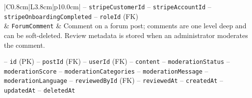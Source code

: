 \begin{center}
\begin{longtable}{|C{0.8cm}|L{3.8cm}|p{10.0cm}|}
\hspace*{1em}-- \texttt{stripe\allowbreak Customer\allowbreak Id} \newline
\hspace*{1em}-- \texttt{stripe\allowbreak Account\allowbreak Id} \newline
\hspace*{1em}-- \texttt{stripe\allowbreak Onboarding\allowbreak Completed} \newline
\hspace*{1em}-- \texttt{role\allowbreak Id} (FK) \\
 & \texttt{Forum\allowbreak Comment} & Comment on a forum post; comments are one level deep and can be soft-deleted. Review metadata is stored when an administrator moderates the comment.\par\smallskip
\hspace*{1em}-- \texttt{id} (PK) \newline
\hspace*{1em}-- \texttt{post\allowbreak Id} (FK) \newline
\hspace*{1em}-- \texttt{user\allowbreak Id} (FK) \newline
\hspace*{1em}-- \texttt{content} \newline
\hspace*{1em}-- \texttt{moderation\allowbreak Status} \newline
\hspace*{1em}-- \texttt{moderation\allowbreak Score} \newline
\hspace*{1em}-- \texttt{moderation\allowbreak Categories} \newline
\hspace*{1em}-- \texttt{moderation\allowbreak Message} \newline
\hspace*{1em}-- \texttt{moderation\allowbreak Language} \newline
\hspace*{1em}-- \texttt{reviewed\allowbreak By\allowbreak Id} (FK) \newline
\hspace*{1em}-- \texttt{reviewed\allowbreak At} \newline
\hspace*{1em}-- \texttt{created\allowbreak At} \newline
\hspace*{1em}-- \texttt{updated\allowbreak At} \newline
\hspace*{1em}-- \texttt{deleted\allowbreak At} \\ \hline
\hline
\end{longtable}\addtocounter{table}{-1}
\end{center}

